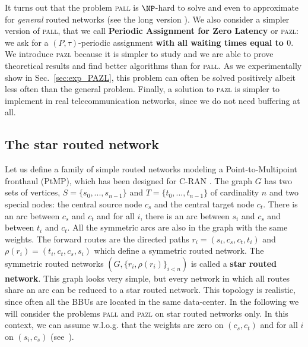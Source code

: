 \documentclass[10pt, conference, letterpaper]{IEEEtran}
\newcommand{\todo}[1]{{\color{red} TODO: {#1}}}
\newcommand\pazl{\textsc{pazl}\xspace}
\newcommand\pall{\textsc{pall}\xspace}
\begin{document}
      It turns out that the problem \pall is $\NP$-hard to solve and even to approximate for \emph{general} routed networks (see the long version \cite{versionlongue}).      
        We also consider a simpler version of \pall, that we call {\bf Periodic Assignment for Zero Latency} or \pazl: we ask for a $(P,\tau)$-periodic assignment {\bf with all waiting times equal to $0$}. We introduce \pazl because it is simpler to study and we are able to prove theoretical results and find better algorithms than for \pall. As we  experimentally show in Sec.~\ref{sec:exp_PAZL}, this problem can often be solved positively albeit less often than the general problem. Finally, a solution to \pazl is simpler to implement in real telecommunication networks, since we do not need buffering at all. 
       
    
    \subsection{The star routed network}
    
     Let us define a family of simple routed networks modeling a Point-to-Multipoint fronthaul (PtMP), which has been designed for C-RAN \cite{tayq2017real}. 
      The graph $G$ has two sets of vertices, $S=\{s_0,...,s_{n-1}\}$ and $T=\{t_0,...,t_{n-1}\}$ of cardinality $n$ and two special nodes:
      the central source node {\bf $c_s$} and the central target node {\bf $c_t$}.
      There is an arc between {\bf $c_s$} and {\bf $c_t$} and for all $i$, there is an arc between $s_i$ and $c_s$ and between $t_i$ and $c_t$.
      All the symmetric arcs are also in the graph with the same weights.
      The forward routes are the directed paths $r_i = (s_i,c_s,c_t,t_i)$ and $\rho(r_i) = (t_i,c_t,c_s,s_i)$ which define a symmetric routed network. 
      The symmetric routed networks $(G, \{r_i,\rho(r_i)\}_{i<n})$ is called a \textbf{star routed network}. This graph looks very simple, but every network in which all routes share an arc can be reduced to a star routed network. This topology is realistic, since often all the BBUs are located in the same data-center. 
      In the following we will consider the problems \pall and \pazl on star routed networks only. 
      In this context, we can assume w.l.o.g. that the weights are zero on $(c_s,c_t)$ and for all $i$ on $(s_i,c_s)$ (see~\cite{versionlongue}).

%      
      
\end{document}
